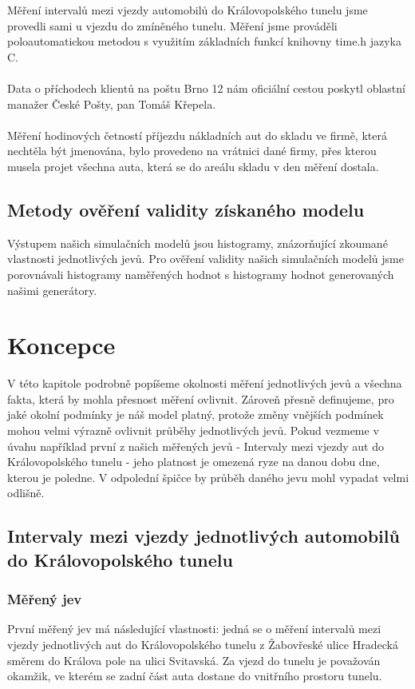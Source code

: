 \documentclass[12pt,a4paper]{article}
\begin{document}
	Měření intervalů mezi vjezdy automobilů
	do Královopolského tunelu jsme provedli sami u vjezdu do zmíněného tunelu. Měření jsme prováděli
	poloautomatickou metodou s využitím základních funkcí knihovny time.h jazyka C. \\ \\

	Data o příchodech klientů na poštu Brno 12 nám oficiální cestou poskytl oblastní manažer 
	České Pošty, pan Tomáš Křepela. \\ \\

	Měření hodinových četností příjezdu nákladních aut do skladu ve firmě, která nechtěla být 
	jmenována, bylo provedeno na vrátnici dané firmy, přes kterou musela projet všechna auta, která 
	se do areálu skladu v den měření dostala.

	\subsection{Metody ověření validity získaného modelu}
	Výstupem našich simulačních modelů jsou histogramy, znázorňující zkoumané vlastnosti
	jednotlivých jevů. Pro ověření validity našich simulačních modelů jsme porovnávali 
	histogramy naměřených hodnot s histogramy hodnot generovaných našimi generátory.

\section{Koncepce}
V této kapitole podrobně popíšeme okolnosti měření jednotlivých jevů a všechna fakta, která by mohla
přesnost měření ovlivnit. Zároveň přesně definujeme, pro jaké okolní podmínky je náš model 
platný, protože změny vnějších podmínek mohou velmi výrazně ovlivnit průběhy jednotlivých jevů.
Pokud vezmeme v úvahu například první z našich měřených jevů - Intervaly mezi vjezdy aut do Královopolského
tunelu - jeho platnost je omezená ryze na danou dobu dne, kterou je poledne. V odpolední špičce
by průběh daného jevu mohl vypadat velmi odlišně.

	\subsection{Intervaly mezi vjezdy jednotlivých automobilů do Královopolského tunelu}
		\subsubsection{Měřený jev}
		První měřený jev má následující vlastnosti: jedná se o měření intervalů mezi vjezdy
		jednotlivých aut do Královopolského tunelu z Žabovřeské ulice Hradecká směrem do Králova pole
		na ulici Svitavská. Za vjezd do tunelu je považován okamžik, ve kterém se zadní část
		auta dostane do vnitřního prostoru tunelu. \\ \\
\end{document}
